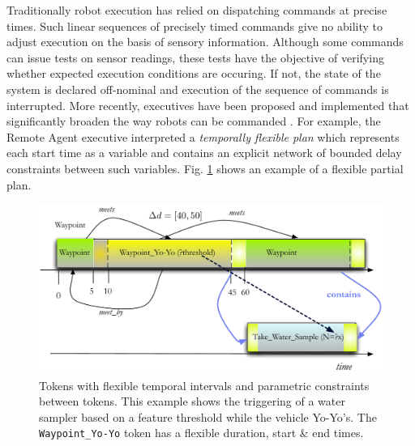Traditionally robot execution has relied on dispatching commands at
precise times. Such linear sequences of precisely timed commands give
no ability to adjust execution on the basis of sensory
information. Although some commands can issue tests on sensor
readings, these tests have the objective of verifying whether expected
execution conditions are occuring. If not, the state of the system is
declared off-nominal and execution of the sequence of commands is
interrupted. More recently, executives have been proposed and
implemented that significantly broaden the way robots can be commanded
\cite{mus98,alami:1998p820}. For example, the Remote Agent executive
interpreted a \textit{temporally flexible plan} which represents each
start time as a variable and contains an explicit network of bounded
delay constraints between such
variables. Fig. \ref{fig:flex-timelines} shows an example of a
flexible partial plan.

\begin{figure}[!htb]
\centering
\includegraphics[scale=0.3]{figs/flexible-timelines.pdf}
\caption{\small Tokens with flexible temporal intervals and parametric
  constraints between tokens. This example shows the triggering of a
  water sampler based on a feature threshold while the vehicle
  Yo-Yo's. The \texttt{Waypoint\_Yo-Yo} token has a flexible duration,
  start \& end times.}
\label{fig:flex-timelines}
\end{figure}

